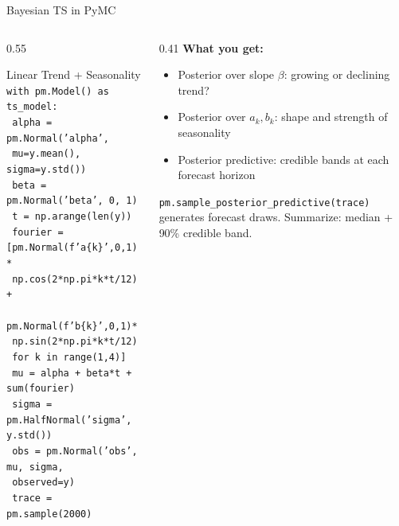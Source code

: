 \documentclass[aspectratio=169, 11pt]{beamer}
\begin{document}
\begin{frame}{Bayesian TS in PyMC}
  \begin{columns}[T]
    \begin{column}{0.55\textwidth}
      \begin{examplebox}{Linear Trend + Seasonality}
        {\tiny
        \texttt{with pm.Model() as ts\_model:}\\
        \texttt{  alpha = pm.Normal('alpha',}\\
        \texttt{    mu=y.mean(), sigma=y.std())}\\
        \texttt{  beta = pm.Normal('beta', 0, 1)}\\[1pt]
        \texttt{  t = np.arange(len(y))}\\
        \texttt{  fourier = [pm.Normal(f'a\{k\}',0,1)*}\\
        \texttt{    np.cos(2*np.pi*k*t/12) +}\\
        \texttt{    pm.Normal(f'b\{k\}',0,1)*}\\
        \texttt{    np.sin(2*np.pi*k*t/12)}\\
        \texttt{    for k in range(1,4)]}\\
        \texttt{  mu = alpha + beta*t + sum(fourier)}\\
        \texttt{  sigma = pm.HalfNormal('sigma', y.std())}\\
        \texttt{  obs = pm.Normal('obs', mu, sigma,}\\
        \texttt{    observed=y)}\\
        \texttt{  trace = pm.sample(2000)}
        }
      \end{examplebox}
    \end{column}
    \begin{column}{0.41\textwidth}
      \textbf{What you get:}
      \begin{itemize}\footnotesize\itemsep0pt
        \item Posterior over slope $\beta$:
              growing or declining trend?
        \item Posterior over $a_k, b_k$:
              shape and strength of seasonality
        \item Posterior predictive: credible bands
              at each forecast horizon
      \end{itemize}
      \begin{keybox}
        \footnotesize \texttt{pm.sample\_posterior\_predictive(trace)}
        generates forecast draws.
        Summarize: median + 90\% credible band.
      \end{keybox}
    \end{column}
  \end{columns}
\end{frame}
\end{document}
